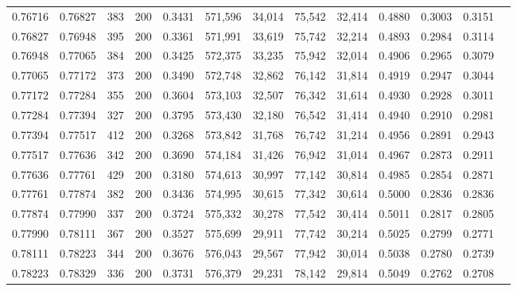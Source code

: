 \begin{tabular}{rrrrrrrrrrrrr}
0.76716 & 0.76827 &    383 & 200 &                                     0.3431 & 571,596 &  34,014 &  75,542 &  32,414 & 0.4880 & 0.3003 & 0.3151 \\
0.76827 & 0.76948 &    395 & 200 &                                     0.3361 & 571,991 &  33,619 &  75,742 &  32,214 & 0.4893 & 0.2984 & 0.3114 \\
0.76948 & 0.77065 &    384 & 200 &                                     0.3425 & 572,375 &  33,235 &  75,942 &  32,014 & 0.4906 & 0.2965 & 0.3079 \\
0.77065 & 0.77172 &    373 & 200 &                                     0.3490 & 572,748 &  32,862 &  76,142 &  31,814 & 0.4919 & 0.2947 & 0.3044 \\
0.77172 & 0.77284 &    355 & 200 &                                     0.3604 & 573,103 &  32,507 &  76,342 &  31,614 & 0.4930 & 0.2928 & 0.3011 \\
0.77284 & 0.77394 &    327 & 200 &                                     0.3795 & 573,430 &  32,180 &  76,542 &  31,414 & 0.4940 & 0.2910 & 0.2981 \\
0.77394 & 0.77517 &    412 & 200 &                                     0.3268 & 573,842 &  31,768 &  76,742 &  31,214 & 0.4956 & 0.2891 & 0.2943 \\
0.77517 & 0.77636 &    342 & 200 &                                     0.3690 & 574,184 &  31,426 &  76,942 &  31,014 & 0.4967 & 0.2873 & 0.2911 \\
0.77636 & 0.77761 &    429 & 200 &                                     0.3180 & 574,613 &  30,997 &  77,142 &  30,814 & 0.4985 & 0.2854 & 0.2871 \\
0.77761 & 0.77874 &    382 & 200 &                                     0.3436 & 574,995 &  30,615 &  77,342 &  30,614 & 0.5000 & 0.2836 & 0.2836 \\
0.77874 & 0.77990 &    337 & 200 &                                     0.3724 & 575,332 &  30,278 &  77,542 &  30,414 & 0.5011 & 0.2817 & 0.2805 \\
0.77990 & 0.78111 &    367 & 200 &                                     0.3527 & 575,699 &  29,911 &  77,742 &  30,214 & 0.5025 & 0.2799 & 0.2771 \\
0.78111 & 0.78223 &    344 & 200 &                                     0.3676 & 576,043 &  29,567 &  77,942 &  30,014 & 0.5038 & 0.2780 & 0.2739 \\
0.78223 & 0.78329 &    336 & 200 &                                     0.3731 & 576,379 &  29,231 &  78,142 &  29,814 & 0.5049 & 0.2762 & 0.2708 \\

\end{tabular}
